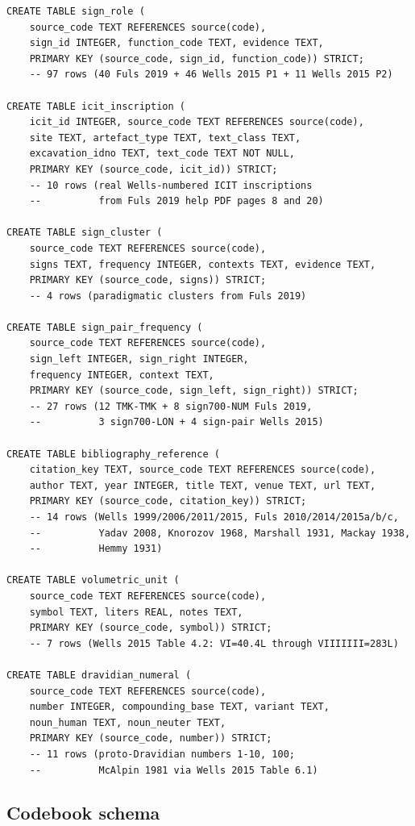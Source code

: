 {\begin{verbatim}
CREATE TABLE sign_role (
    source_code TEXT REFERENCES source(code),
    sign_id INTEGER, function_code TEXT, evidence TEXT,
    PRIMARY KEY (source_code, sign_id, function_code)) STRICT;
    -- 97 rows (40 Fuls 2019 + 46 Wells 2015 P1 + 11 Wells 2015 P2)

CREATE TABLE icit_inscription (
    icit_id INTEGER, source_code TEXT REFERENCES source(code),
    site TEXT, artefact_type TEXT, text_class TEXT,
    excavation_idno TEXT, text_code TEXT NOT NULL,
    PRIMARY KEY (source_code, icit_id)) STRICT;
    -- 10 rows (real Wells-numbered ICIT inscriptions
    --          from Fuls 2019 help PDF pages 8 and 20)

CREATE TABLE sign_cluster (
    source_code TEXT REFERENCES source(code),
    signs TEXT, frequency INTEGER, contexts TEXT, evidence TEXT,
    PRIMARY KEY (source_code, signs)) STRICT;
    -- 4 rows (paradigmatic clusters from Fuls 2019)

CREATE TABLE sign_pair_frequency (
    source_code TEXT REFERENCES source(code),
    sign_left INTEGER, sign_right INTEGER,
    frequency INTEGER, context TEXT,
    PRIMARY KEY (source_code, sign_left, sign_right)) STRICT;
    -- 27 rows (12 TMK-TMK + 8 sign700-NUM Fuls 2019,
    --          3 sign700-LON + 4 sign-pair Wells 2015)

CREATE TABLE bibliography_reference (
    citation_key TEXT, source_code TEXT REFERENCES source(code),
    author TEXT, year INTEGER, title TEXT, venue TEXT, url TEXT,
    PRIMARY KEY (source_code, citation_key)) STRICT;
    -- 14 rows (Wells 1999/2006/2011/2015, Fuls 2010/2014/2015a/b/c,
    --          Yadav 2008, Knorozov 1968, Marshall 1931, Mackay 1938,
    --          Hemmy 1931)

CREATE TABLE volumetric_unit (
    source_code TEXT REFERENCES source(code),
    symbol TEXT, liters REAL, notes TEXT,
    PRIMARY KEY (source_code, symbol)) STRICT;
    -- 7 rows (Wells 2015 Table 4.2: VI=40.4L through VIIIIIII=283L)

CREATE TABLE dravidian_numeral (
    source_code TEXT REFERENCES source(code),
    number INTEGER, compounding_base TEXT, variant TEXT,
    noun_human TEXT, noun_neuter TEXT,
    PRIMARY KEY (source_code, number)) STRICT;
    -- 11 rows (proto-Dravidian numbers 1-10, 100;
    --          McAlpin 1981 via Wells 2015 Table 6.1)
\end{verbatim}
}

\subsection{Codebook schema}

